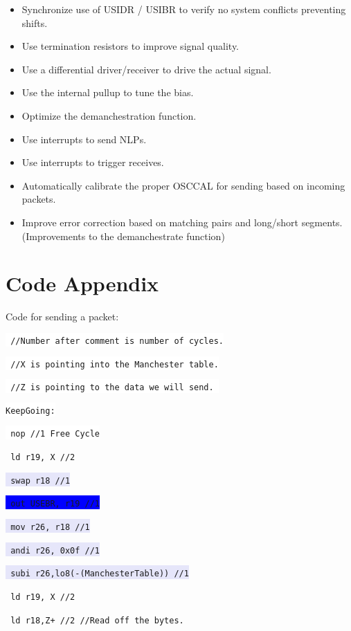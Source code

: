 \documentclass{article}
\begin{document}
\begin{itemize}
\item Synchronize use of USIDR / USIBR to verify no system conflicts preventing shifts.
\item Use termination resistors to improve signal quality.
\item Use a differential driver/receiver to drive the actual signal.
\item Use the internal pullup to tune the bias.
\item Optimize the demanchestration function.
\item Use interrupts to send NLPs.
\item Use interrupts to trigger receives.
\item Automatically calibrate the proper OSCCAL for sending based on incoming packets.
\item Improve error correction based on matching pairs and long/short segments. (Improvements to the demanchestrate function)
\end{itemize}

\section{Code Appendix}
Code for sending a packet:

\texttt{\colorbox{White}{ //Number after comment is number of cycles.}}

\texttt{\colorbox{White}{ //X is pointing into the Manchester table.}}

\texttt{\colorbox{White}{ //Z is pointing to the data we will send. }}

\texttt{\colorbox{White}{KeepGoing:}}

\texttt{\colorbox{White}{	nop		//1 Free Cycle} }

\texttt{\colorbox{Apricot}{	ld r19, X      //2} }

\texttt{\colorbox{Lavender}{	swap r18       //1} }

\texttt{\colorbox{blue}{	out USEBR, r19 //1} }

\texttt{\colorbox{Lavender}{	mov r26, r18   //1} }

\texttt{\colorbox{Lavender}{	andi r26, 0x0f //1} }

\texttt{\colorbox{Lavender}{	subi r26,lo8(-(ManchesterTable)) //1} }

\texttt{\colorbox{Apricot}{	ld r19, X      //2} }

\texttt{\colorbox{RedOrange}{	ld r18,Z+      //2  //Read off the bytes.} }
\end{document}
